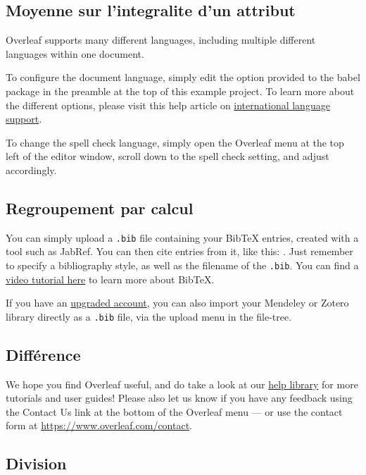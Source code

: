 \documentclass{article}
\begin{document}
\subsection{Moyenne sur l'integralite d'un attribut}

Overleaf supports many different languages, including multiple different languages within one document. 

To configure the document language, simply edit the option provided to the babel package in the preamble at the top of this example project. To learn more about the different options, please visit this help article on \href{https://www.overleaf.com/learn/latex/International_language_support}{international language support}.

To change the spell check language, simply open the Overleaf menu at the top left of the editor window, scroll down to the spell check setting, and adjust accordingly.

\subsection{Regroupement par calcul}

You can simply upload a \verb|.bib| file containing your BibTeX entries, created with a tool such as JabRef. You can then cite entries from it, like this: \cite{greenwade93}. Just remember to specify a bibliography style, as well as the filename of the \verb|.bib|. You can find a \href{https://www.overleaf.com/help/97-how-to-include-a-bibliography-using-bibtex}{video tutorial here} to learn more about BibTeX.

If you have an \href{https://www.overleaf.com/user/subscription/plans}{upgraded account}, you can also import your Mendeley or Zotero library directly as a \verb|.bib| file, via the upload menu in the file-tree.

\subsection{Différence}

We hope you find Overleaf useful, and do take a look at our \href{https://www.overleaf.com/learn}{help library} for more tutorials and user guides! Please also let us know if you have any feedback using the Contact Us link at the bottom of the Overleaf menu --- or use the contact form at \url{https://www.overleaf.com/contact}.

\subsection{Division}
\end{document}
